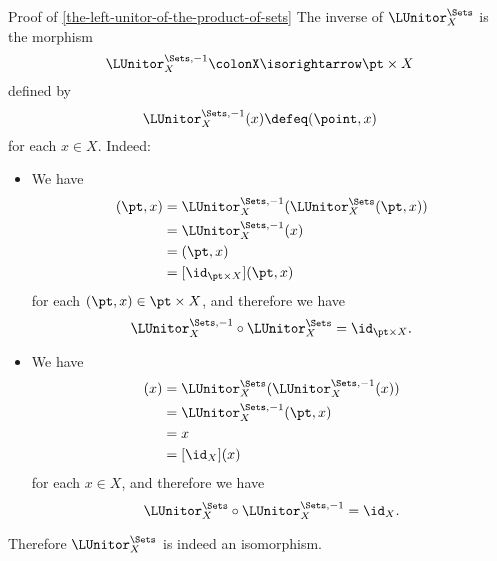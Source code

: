 \begin{Proof}{Proof of \cref{the-left-unitor-of-the-product-of-sets}}%
    The inverse of $\LUnitor^{\Sets}_{X}$ is the morphism
    \[
        \LUnitor^{\Sets,-1}_{X}%
        \colon%
        X%
        \isorightarrow%
        \pt\times X%
    \]%
    defined by
    \[
        \LUnitor^{\Sets,-1}_{X}(x)%
        \defeq%
        (\point,x)
    \]%
    for each $x\in X$. Indeed:
    \begin{itemize}
        \item{}We have
            \begin{align*}
                [\LUnitor^{\Sets,-1}_{X}\circ\LUnitor^{\Sets}_{X}](\pt,x) &= \LUnitor^{\Sets,-1}_{X}(\LUnitor^{\Sets}_{X}(\pt,x))\\
                                                                          &= \LUnitor^{\Sets,-1}_{X}(x)\\
                                                                          &= (\pt,x)\\
                                                                          &= [\id_{\pt\times X}](\pt,x)
            \end{align*}
            for each $(\pt,x)\in\pt\times X$, and therefore we have
            \[
                \LUnitor^{\Sets,-1}_{X}%
                \circ%
                \LUnitor^{\Sets}_{X}%
                =%
                \id_{\pt\times X}.%
            \]%
        \item{}We have
            \begin{align*}
                [\LUnitor^{\Sets}_{X}\circ\LUnitor^{\Sets,-1}_{X}](x) &= \LUnitor^{\Sets}_{X}(\LUnitor^{\Sets,-1}_{X}(x))\\
                                                                      &= \LUnitor^{\Sets,-1}_{X}(\pt,x)\\
                                                                      &= x\\
                                                                      &= [\id_{X}](x)
            \end{align*}
            for each $x\in X$, and therefore we have
            \[
                \LUnitor^{\Sets}_{X}%
                \circ%
                \LUnitor^{\Sets,-1}_{X}%
                =%
                \id_{X}.%
            \]%
    \end{itemize}
    Therefore $\LUnitor^{\Sets}_{X}$ is indeed an isomorphism.


\end{Proof}
